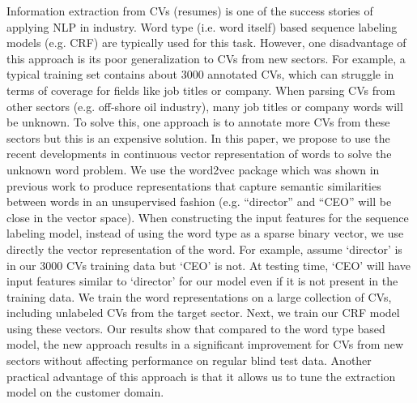 \documentclass[10pt, a4paper, twopage, headinclude, footinclude, BCOR5mm]{book}
\begin{document}
\begin{table}[t!]
\end{table} 
\noindent
Information extraction from CVs (resumes) is one of the success stories of applying NLP in industry. Word type (i.e. word itself) based sequence labeling models (e.g. CRF) are typically used for this task. However, one disadvantage of this approach is its poor generalization to CVs from new sectors. For example, a typical training set contains about 3000 annotated CVs, which can struggle in terms of coverage for fields like job titles or company. When parsing CVs from other sectors (e.g. off-shore oil industry), many job titles or company words will be unknown. To solve this, one approach is to annotate more CVs from these sectors but this is an expensive solution.   In this paper, we propose to use the recent developments in continuous vector representation of words to solve the unknown word problem. We use the word2vec package which was shown in previous work to produce representations that capture semantic similarities between words in an unsupervised fashion (e.g. “director” and “CEO” will be close in the vector space). When constructing the input features for the sequence labeling model, instead of using the word type as a sparse binary vector, we use directly the vector representation of the word. For example, assume ‘director’ is in our 3000 CVs training data but ‘CEO’ is not. At testing time, ‘CEO’ will have input features similar to ‘director’ for our model even if it is not present in the training data.  We train the word representations on a large collection of CVs, including unlabeled CVs from the target sector. Next, we train our CRF model using these vectors. Our results show that compared to the word type based model, the new approach results in a significant improvement for CVs from new sectors without affecting performance on regular blind test data. Another practical advantage of this approach is that it allows us to tune the extraction model on the customer domain.  
\end{document}
